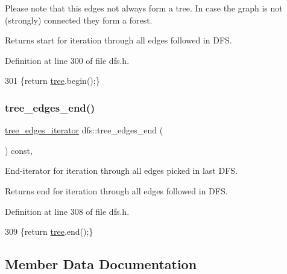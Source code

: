 Please note that this edges not always form a tree. In case the graph is not (strongly) connected they form a forest.

\begin{DoxyReturn}{Returns}
start for iteration through all edges followed in D\+FS. 
\end{DoxyReturn}


Definition at line 300 of file dfs.\+h.


\begin{DoxyCode}
301     \{\textcolor{keywordflow}{return} \mbox{\hyperlink{classdfs_aed496b618a937723bfec0b463e17e8d5}{tree}}.begin();\}
\end{DoxyCode}
\mbox{\label{classdfs_ad1b9f759569cb52ba7ee415862c79831}} 
\subsubsection{\texorpdfstring{tree\+\_\+edges\+\_\+end()}{tree\_edges\_end()}}
{\footnotesize\ttfamily \mbox{\hyperlink{classdfs_accde8d5403404f6d22fe4756d4ffedd5}{tree\+\_\+edges\+\_\+iterator}} dfs\+::tree\+\_\+edges\+\_\+end (\begin{DoxyParamCaption}{ }\end{DoxyParamCaption}) const\hspace{0.3cm}{\ttfamily [inline]}, {\ttfamily [inherited]}}



End-\/iterator for iteration through all edges picked in last D\+FS. 

\begin{DoxyReturn}{Returns}
end for iteration through all edges followed in D\+FS. 
\end{DoxyReturn}


Definition at line 308 of file dfs.\+h.


\begin{DoxyCode}
309     \{\textcolor{keywordflow}{return} \mbox{\hyperlink{classdfs_aed496b618a937723bfec0b463e17e8d5}{tree}}.end();\}
\end{DoxyCode}


\subsection{Member Data Documentation}
\mbox{\label{classdfs_ab0251ac30adfd569e214a64db7f3a905}} 
